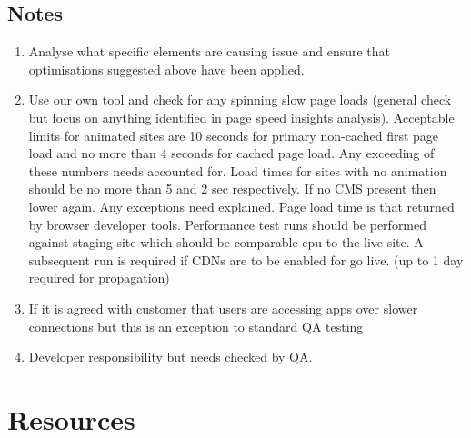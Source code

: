 \documentclass[letterpaper,10pt,english]{sphinxmanual}
\begin{document}
\section{Notes}
\label{performance_plan:notes}\begin{enumerate}
\item {} 
Analyse what specific elements are causing issue and ensure that optimisations suggested above have been applied.

\item {} 
Use our own tool and check for any spinning slow page loads (general check but focus on anything identified in page speed insights analysis).  Acceptable limits for animated sites are 10 seconds for primary non-cached first page load and no more than 4 seconds for cached page load.  Any exceeding of these numbers needs accounted for. Load times for sites with no animation should be no more than 5 and 2 sec respectively. If no CMS present then lower again. Any exceptions need explained. Page load time is that returned by browser developer tools. Performance test runs should be performed against staging site which should be comparable cpu to the live site. A subsequent run is required if CDNs are to be enabled for go live. (up to 1 day required for propagation)

\item {} 
If it is agreed with customer that users are accessing apps over slower connections but this is an exception to standard QA testing

\item {} 
Developer responsibility but needs checked by QA.

\end{enumerate}


\chapter{Resources}
\label{resources::doc}\label{resources:resources}
\end{document}
